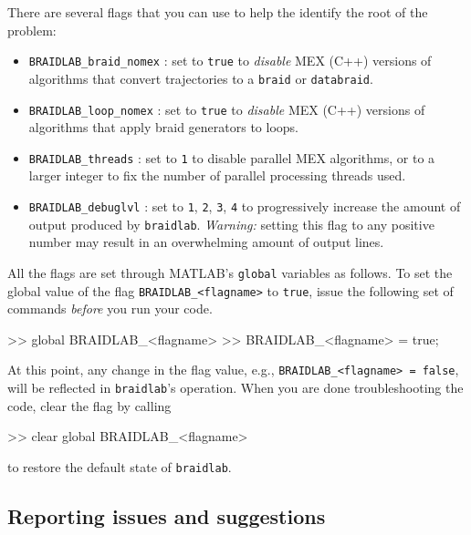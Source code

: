 \documentclass[12pt]{article}
\newcommand{\braidlab}{\texttt{braidlab}}%
\begin{document}
%
There are several flags that you can use to help the identify the root of the
problem:
\begin{itemize}
\item \lstinline{BRAIDLAB_braid_nomex}%
  :
  set to \lstinline{true} to \emph{disable} MEX %
  (C++) versions of algorithms that convert trajectories to a
  \lstinline{braid} or \lstinline{databraid}.
\item \lstinline{BRAIDLAB_loop_nomex}%
  :
  set to \lstinline{true} to \emph{disable} MEX %
  (C++) versions of algorithms that apply braid generators to loops.
\item \lstinline{BRAIDLAB_threads}%
  : set to
  \lstinline{1} to disable parallel MEX %
  algorithms, or to a larger integer to fix the number of parallel processing
  threads used.
\item \lstinline{BRAIDLAB_debuglvl}%
  : set
  to \lstinline{1}, \lstinline{2}, \lstinline{3}, \lstinline{4} to
  progressively increase the amount of output produced by
  \braidlab. \emph{Warning:} setting this flag to any positive number may
  result in an overwhelming amount of output lines.
\end{itemize}

All the flags are set through MATLAB's \lstinline{global} variables as follows.
To set the global value of the flag \lstinline{BRAIDLAB_<flagname>} to \lstinline{true}, issue the following set of commands \emph{before} you run your code.
\begin{lstbraidlab}
>> global BRAIDLAB_<flagname>
>> BRAIDLAB_<flagname> = true;
\end{lstbraidlab}
At this point, any change in the flag value, e.g.,
\lstinline{BRAIDLAB_<flagname> = false}, will be reflected in \braidlab's
operation. When you are done troubleshooting the code, clear the flag by
calling
\begin{lstbraidlab}
>> clear global BRAIDLAB_<flagname>
\end{lstbraidlab}
to restore the default state of \braidlab.
%


\subsection{Reporting issues and suggestions}
\label{sec:reporting-issues}
\end{document}
